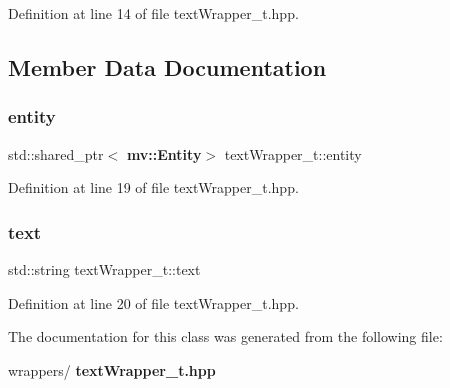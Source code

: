 Definition at line 14 of file text\+Wrapper\+\_\+t.\+hpp.



\subsection{Member Data Documentation}
\mbox{\label{classtext_wrapper__t_ae98a33e955421fd0c537346634e131e6}} 
\subsubsection{entity}
{\footnotesize\ttfamily std\+::shared\+\_\+ptr$<$\textbf{ mv\+::\+Entity}$>$ text\+Wrapper\+\_\+t\+::entity}



Definition at line 19 of file text\+Wrapper\+\_\+t.\+hpp.

\mbox{\label{classtext_wrapper__t_a82f0febb5d1163b192d6cb79ee229bae}} 
\subsubsection{text}
{\footnotesize\ttfamily std\+::string text\+Wrapper\+\_\+t\+::text}



Definition at line 20 of file text\+Wrapper\+\_\+t.\+hpp.



The documentation for this class was generated from the following file\+:\begin{DoxyCompactItemize}
\item 
wrappers/\textbf{ text\+Wrapper\+\_\+t.\+hpp}\end{DoxyCompactItemize}
